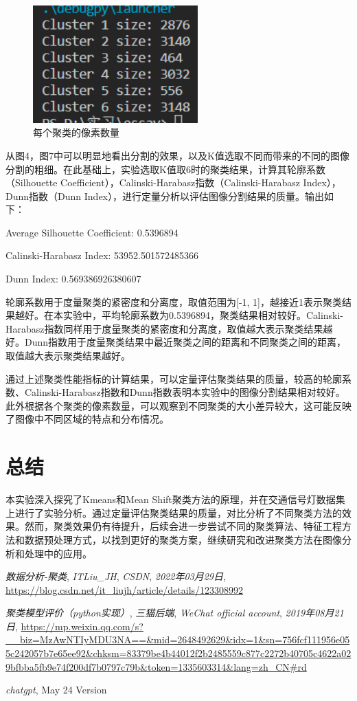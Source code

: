 \documentclass[lettersize,journal]{IEEEtran}
\begin{document}
\begin{figure}[H]
\centering
\includegraphics[width=2.5in]{image/K6.png}
\caption{每个聚类的像素数量}
\end{figure}

从图4，图7中可以明显地看出分割的效果，以及K值选取不同而带来的不同的图像分割的粗细。在此基础上，实验选取K值取6时的聚类结果，计算其轮廓系数（Silhouette Coefficient），Calinski-Harabasz指数（Calinski-Harabasz Index），Dunn指数（Dunn Index），进行定量分析以评估图像分割结果的质量。输出如下：

Average Silhouette Coefficient: 0.5396894

Calinski-Harabasz Index: 53952.501572485366

Dunn Index: 0.569386926380607

轮廓系数用于度量聚类的紧密度和分离度，取值范围为[-1, 1]，越接近1表示聚类结果越好。在本实验中，平均轮廓系数为0.5396894，聚类结果相对较好。Calinski-Harabasz指数同样用于度量聚类的紧密度和分离度，取值越大表示聚类结果越好。Dunn指数用于度量聚类结果中最近聚类之间的距离和不同聚类之间的距离，取值越大表示聚类结果越好。

通过上述聚类性能指标的计算结果，可以定量评估聚类结果的质量，较高的轮廓系数、Calinski-Harabasz指数和Dunn指数表明本实验中的图像分割结果相对较好。此外根据各个聚类的像素数量，可以观察到不同聚类的大小差异较大，这可能反映了图像中不同区域的特点和分布情况。

\section{总结}

本实验深入探究了K\-means和Mean Shift聚类方法的原理，并在交通信号灯数据集上进行了实验分析。通过定量评估聚类结果的质量，对比分析了不同聚类方法的效果。然而，聚类效果仍有待提升，后续会进一步尝试不同的聚类算法、特征工程方法和数据预处理方式，以找到更好的聚类方案，继续研究和改进聚类方法在图像分析和处理中的应用。


\begin{thebibliography}{1}

{\it{数据分析-聚类}}, {\it{ITLiu\_JH}}, {\it{CSDN}}, {\it{2022年03月29日}}, \url{https://blog.csdn.net/it_liujh/article/details/123308992}

{\it{聚类模型评价（python实现）}}, {\it{三猫后端}}, {\it{WeChat official account}}, {\it{2019年08月21日}}, \url{https://mp.weixin.qq.com/s?__biz=MzAwNTIyMDU3NA==&mid=2648492629&idx=1&sn=756fcf111956e055c242057b7e65ee92&chksm=83379be4b44012f2b2485559c877c2272b40705c4622a029bfbba5fb9e74f200df7b0797c79b&token=1335603314&lang=zh_CN#rd}

{\it{chatgpt}}, May 24 Version

\end{thebibliography}
\end{document}

